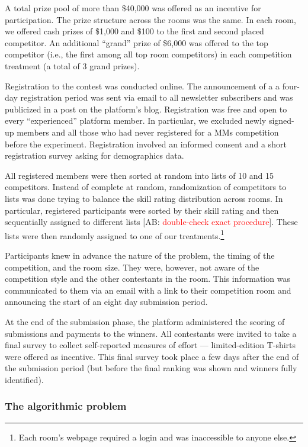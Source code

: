 \documentclass[10pt, titlepage]{article}
\begin{document}
A total prize pool of more than \$40,000 was offered as an incentive for
participation. The prize structure across the rooms was the same. In
each room, we offered cash prizes of \$1,000 and \$100 to the first and
second placed competitor. An additional ``grand'' prize of \$6,000 was
offered to the top competitor (i.e., the first among all top room
competitors) in each competition treatment (a total of 3 grand prizes).

Registration to the contest was conducted online. The announcement of a
a four-day registration period was sent via email to all newsletter
subscribers and was publicized in a post on the platform's blog.
Registration was free and open to every ``experienced'' platform member.
In particular, we excluded newly signed-up members and all those who had
never registered for a MMs competition before the experiment.
Registration involved an informed consent and a short registration
survey asking for demographics data.

All registered members were then sorted at random into lists of 10 and
15 competitors. Instead of complete at random, randomization of
competitors to lists was done trying to balance the skill rating
distribution across rooms. In particular, registered participants were
sorted by their skill rating and then sequentially assigned to different
lists {[}AB: \textcolor{red}{double-check exact procedure}{]}. These
lists were then randomly assigned to one of our treatments.\footnote{Each
  room's webpage required a login and was inaccessible to anyone else.}

Participants knew in advance the nature of the problem, the timing of
the competition, and the room size. They were, however, not aware of the
competition style and the other contestants in the room. This
information was communicated to them via an email with a link to their
competition room and announcing the start of an eight day submission
period.

At the end of the submission phase, the platform administered the
scoring of submissions and payments to the winners. All contestants were
invited to take a final survey to collect self-reported measures of
effort --- limited-edition T-shirts were offered as incentive. This
final survey took place a few days after the end of the submission
period (but before the final ranking was shown and winners fully
identified).

\subsubsection{The algorithmic problem}\label{the-algorithmic-problem}
\end{document}
